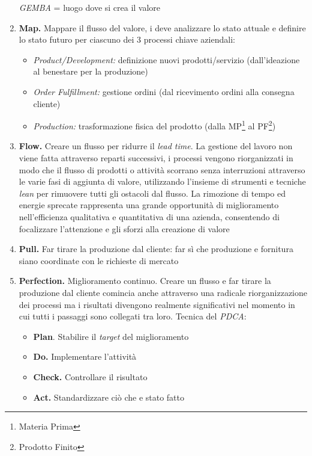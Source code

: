 \begin{enumerate}
		\textit{GEMBA} = luogo dove si crea il valore
	\item \textbf{Map.} Mappare il flusso del valore, i deve analizzare lo stato attuale e definire lo stato futuro per ciascuno dei 3 processi chiave aziendali:
		\begin{itemize}
			\item \textit{Product/Development:} definizione nuovi prodotti/servizio (dall’ideazione al benestare per la produzione)
			\item \textit{Order Fulfillment:} gestione ordini (dal ricevimento ordini alla consegna cliente)
			\item \textit{Production:} trasformazione fisica del prodotto (dalla MP\footnote{ Materia Prima} al PF\footnote{ Prodotto Finito})
		\end{itemize}
	\item \textbf{Flow.} Creare un flusso per ridurre il \textit{lead time}. La gestione del lavoro non viene fatta attraverso reparti successivi, i processi vengono riorganizzati in modo che il flusso di prodotti o attività scorrano senza interruzioni attraverso le varie fasi di aggiunta di valore, utilizzando l’insieme di strumenti e tecniche \textit{lean} per rimuovere tutti gli ostacoli dal flusso. La rimozione di tempo ed energie sprecate rappresenta una grande opportunità di miglioramento nell’efficienza qualitativa e quantitativa di una azienda, consentendo di focalizzare l’attenzione e gli sforzi alla creazione di valore
	\item \textbf{Pull.} Far tirare la produzione dal cliente: far sì che produzione e fornitura siano coordinate con le richieste di mercato
	\item \textbf{Perfection.} Miglioramento continuo. Creare un flusso e far tirare la produzione dal cliente comincia anche attraverso una radicale riorganizzazione dei processi ma i risultati divengono realmente significativi nel momento in cui tutti i passaggi sono collegati tra loro. Tecnica del \textit{PDCA}:
		\begin{itemize}
			\item \textbf{Plan}. Stabilire il \textit{target} del miglioramento
			\item \textbf{Do.} Implementare l’attività
			\item \textbf{Check.} Controllare il risultato
			\item \textbf{Act.} Standardizzare ciò che e stato fatto
		\end{itemize}
\end{enumerate}

